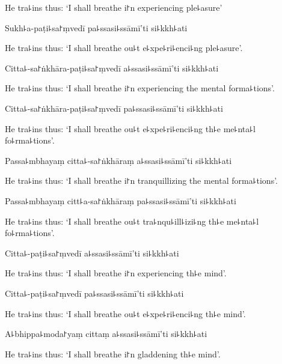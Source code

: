 \begin{english}
  He tra꜕ins thus: `I shall breathe i꜓n experiencing ple꜕asure'
\end{english}

Sukh꜕a-paṭi꜕sa꜓ṃvedī pa꜕ssasi꜕ssāmī'ti si꜕kkh꜕ati

\begin{english}
  He tra꜕ins thus: `I shall breathe ou꜕t e꜕xpe꜕ri꜕enci꜕ng ple꜕asure'.
\end{english}

Citta꜕-sa꜓ṅkhāra-paṭi꜕sa꜓ṃvedī a꜕ssasi꜕ssāmī'ti si꜕kkh꜕ati

\begin{english}
  He tra꜕ins thus: `I shall breathe i꜓n experiencing the mental forma꜕tions'.
\end{english}

Citta꜕-sa꜓ṅkhāra-paṭi꜕sa꜓ṃvedī pa꜕ssasi꜕ssāmī'ti si꜕kkh꜕ati

\begin{english}
  He tra꜕ins thus: `I shall breathe ou꜕t e꜕xpe꜕ri꜕enci꜕ng th꜕e me꜕nta꜕l fo꜕rma꜕tions'.
\end{english}

Passa꜕mbhayaṃ citta꜕-sa꜓ṅkhāraṃ a꜕ssasi꜕ssāmī'ti si꜕kkh꜕ati

\begin{english}
  He tra꜕ins thus: `I shall breathe i꜓n tranquillizing the mental forma꜕tions'.
\end{english}

Passa꜕mbhayaṃ citt꜕a-sa꜓ṅkhāraṃ pa꜕ssasi꜕ssāmī'ti si꜕kkh꜕ati

\begin{english}
  He tra꜕ins thus: `I shall breathe ou꜕t tra꜕nqu꜕ill꜕izi꜕ng th꜕e me꜕nta꜕l fo꜕rma꜕tions'.
\end{english}

Citta꜕-paṭi꜕sa꜓ṃvedī a꜕ssasi꜕ssāmī'ti si꜕kkh꜕ati

\begin{english}
  He tra꜕ins thus: `I shall breathe i꜓n experiencing th꜕e mind'.
\end{english}

Citta꜕-paṭi꜕sa꜓ṃvedī pa꜕ssasi꜕ssāmī'ti si꜕kkh꜕ati

\begin{english}
  He tra꜕ins thus: `I shall breathe ou꜕t e꜕xpe꜕ri꜕enci꜕ng th꜕e mind'.
\end{english}

A꜕bhippa꜕moda꜓yaṃ cittaṃ a꜕ssasi꜕ssāmī'ti si꜕kkh꜕ati

\begin{english}
  He tra꜕ins thus: `I shall breathe i꜓n gladdening th꜕e mind'.
\end{english}

